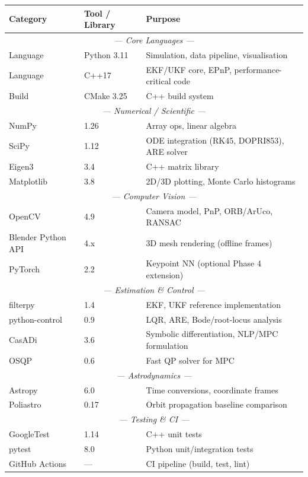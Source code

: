 \documentclass[12pt, a4paper]{article}
\begin{document}
\begin{longtable}{@{}llp{7cm}@{}}
\toprule
\textbf{Category} & \textbf{Tool / Library} & \textbf{Purpose} \\
\midrule
\endhead
\multicolumn{3}{c}{\textit{--- Core Languages ---}} \\
Language & Python 3.11 & Simulation, data pipeline, visualisation \\
Language & C++17       & EKF/UKF core, EPnP, performance-critical code \\
Build    & CMake 3.25  & C++ build system \\
\midrule
\multicolumn{3}{c}{\textit{--- Numerical / Scientific ---}} \\
NumPy & 1.26 & Array ops, linear algebra \\
SciPy & 1.12 & ODE integration (RK45, DOPRI853), ARE solver \\
Eigen3 & 3.4 & C++ matrix library \\
Matplotlib & 3.8 & 2D/3D plotting, Monte Carlo histograms \\
\midrule
\multicolumn{3}{c}{\textit{--- Computer Vision ---}} \\
OpenCV & 4.9 & Camera model, PnP, ORB/ArUco, RANSAC \\
Blender Python API & 4.x & 3D mesh rendering (offline frames) \\
PyTorch & 2.2 & Keypoint NN (optional Phase 4 extension) \\
\midrule
\multicolumn{3}{c}{\textit{--- Estimation \& Control ---}} \\
filterpy & 1.4 & EKF, UKF reference implementation \\
python-control & 0.9 & LQR, ARE, Bode/root-locus analysis \\
CasADi & 3.6 & Symbolic differentiation, NLP/MPC formulation \\
OSQP & 0.6 & Fast QP solver for MPC \\
\midrule
\multicolumn{3}{c}{\textit{--- Astrodynamics ---}} \\
Astropy & 6.0 & Time conversions, coordinate frames \\
Poliastro & 0.17 & Orbit propagation baseline comparison \\
\midrule
\multicolumn{3}{c}{\textit{--- Testing \& CI ---}} \\
GoogleTest & 1.14 & C++ unit tests \\
pytest & 8.0 & Python unit/integration tests \\
GitHub Actions & --- & CI pipeline (build, test, lint) \\
\bottomrule
\end{longtable}
\end{document}
